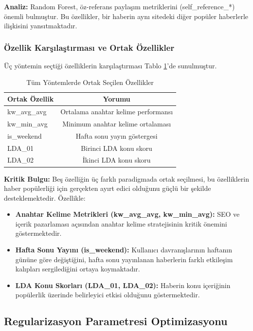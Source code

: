 \documentclass[conference]{IEEEtran}
\begin{document}
\textbf{Analiz:} Random Forest, öz-referans paylaşım metriklerini (self\_reference\_*) önemli bulmuştur. Bu özellikler, bir haberin aynı sitedeki diğer popüler haberlerle ilişkisini yansıtmaktadır.

\subsubsection{Özellik Karşılaştırması ve Ortak Özellikler}

Üç yöntemin seçtiği özelliklerin karşılaştırması Tablo \ref{tab:feature_comparison}'de sunulmuştur.

\begin{table}[H]
\centering
\caption{Tüm Yöntemlerde Ortak Seçilen Özellikler}
\label{tab:feature_comparison}
\begin{tabular}{lc}
\toprule
\textbf{Ortak Özellik} & \textbf{Yorumu} \\
\midrule
kw\_avg\_avg & Ortalama anahtar kelime performansı \\
kw\_min\_avg & Minimum anahtar kelime ortalaması \\
is\_weekend & Hafta sonu yayın göstergesi \\
LDA\_01 & Birinci LDA konu skoru \\
LDA\_02 & İkinci LDA konu skoru \\
\bottomrule
\end{tabular}
\end{table}

\textbf{Kritik Bulgu:} Beş özelliğin üç farklı paradigmada ortak seçilmesi, bu özelliklerin haber popülerliği için gerçekten ayırt edici olduğunu güçlü bir şekilde desteklemektedir. Özellikle:

\begin{itemize}
    \item \textbf{Anahtar Kelime Metrikleri (kw\_avg\_avg, kw\_min\_avg):} SEO ve içerik pazarlaması açısından anahtar kelime stratejisinin kritik önemini göstermektedir.
    \item \textbf{Hafta Sonu Yayını (is\_weekend):} Kullanıcı davranışlarının haftanın gününe göre değiştiğini, hafta sonu yayınlanan haberlerin farklı etkileşim kalıpları sergilediğini ortaya koymaktadır.
    \item \textbf{LDA Konu Skorları (LDA\_01, LDA\_02):} Haberin konu içeriğinin popülerlik üzerinde belirleyici etkisi olduğunu göstermektedir.
\end{itemize}

\subsection{Regularizasyon Parametresi Optimizasyonu}
\end{document}
